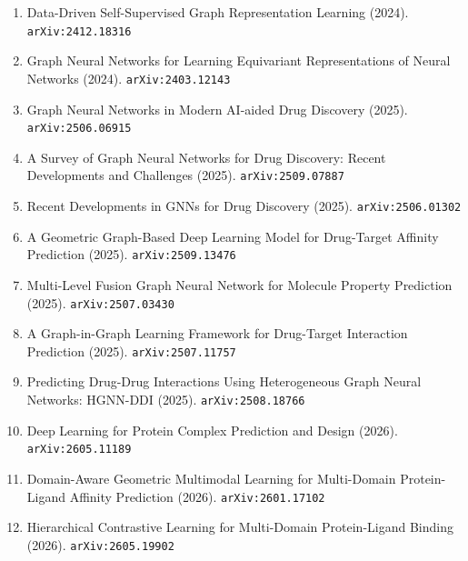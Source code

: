 \documentclass[11pt]{article}
\begin{document}
\begin{enumerate}
  \item Data-Driven Self-Supervised Graph Representation Learning (2024). \texttt{arXiv:2412.18316}
  \item Graph Neural Networks for Learning Equivariant Representations of Neural
  Networks (2024). \texttt{arXiv:2403.12143}
  \item Graph Neural Networks in Modern AI-aided Drug Discovery (2025). \texttt{arXiv:2506.06915}
  \item A Survey of Graph Neural Networks for Drug Discovery: Recent Developments and Challenges (2025). \texttt{arXiv:2509.07887}
  \item Recent Developments in GNNs for Drug Discovery (2025). \texttt{arXiv:2506.01302}
  \item A Geometric Graph-Based Deep Learning Model for Drug-Target Affinity Prediction (2025). \texttt{arXiv:2509.13476}
  \item Multi-Level Fusion Graph Neural Network for Molecule Property Prediction (2025). \texttt{arXiv:2507.03430}
  \item A Graph-in-Graph Learning Framework for Drug-Target Interaction Prediction (2025). \texttt{arXiv:2507.11757}
  \item Predicting Drug-Drug Interactions Using Heterogeneous Graph Neural Networks: HGNN-DDI (2025). \texttt{arXiv:2508.18766}
  \item Deep Learning for Protein Complex Prediction and Design (2026). \texttt{arXiv:2605.11189}
  \item Domain-Aware Geometric Multimodal Learning for Multi-Domain Protein-Ligand Affinity Prediction (2026). \texttt{arXiv:2601.17102}
  \item Hierarchical Contrastive Learning for Multi-Domain Protein-Ligand Binding (2026). \texttt{arXiv:2605.19902}
\end{enumerate}
\end{document}
